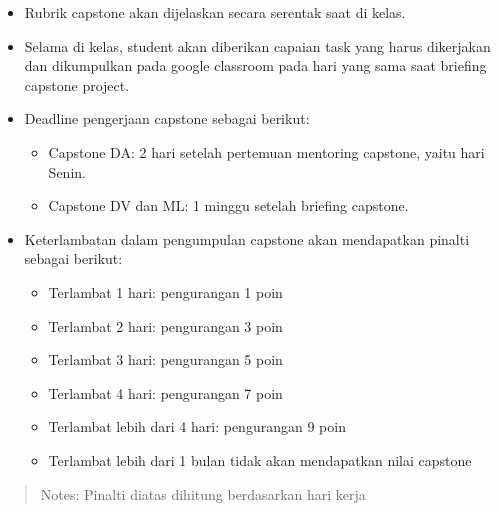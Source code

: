 \documentclass[
]{book}
\providecommand{\tightlist}{%
  \setlength{\itemsep}{0pt}\setlength{\parskip}{0pt}}
\begin{document}
\begin{itemize}
\item
  Rubrik capstone akan dijelaskan secara serentak saat di kelas.
\item
  Selama di kelas, student akan diberikan capaian task yang harus dikerjakan dan dikumpulkan pada google classroom pada hari yang sama saat briefing capstone project.
\item
  Deadline pengerjaan capstone sebagai berikut:

  \begin{itemize}
  \tightlist
  \item
    Capstone DA: 2 hari setelah pertemuan mentoring capstone, yaitu hari Senin.
  \item
    Capstone DV dan ML: 1 minggu setelah briefing capstone.
  \end{itemize}
\item
  Keterlambatan dalam pengumpulan capstone akan mendapatkan pinalti sebagai berikut:

  \begin{itemize}
  \tightlist
  \item
    Terlambat 1 hari: pengurangan 1 poin
  \item
    Terlambat 2 hari: pengurangan 3 poin
  \item
    Terlambat 3 hari: pengurangan 5 poin
  \item
    Terlambat 4 hari: pengurangan 7 poin
  \item
    Terlambat lebih dari 4 hari: pengurangan 9 poin
  \item
    Terlambat lebih dari 1 bulan tidak akan mendapatkan nilai capstone
  \end{itemize}
\end{itemize}

\begin{quote}
Notes: Pinalti diatas dihitung berdasarkan hari kerja
\end{quote}
\end{document}
